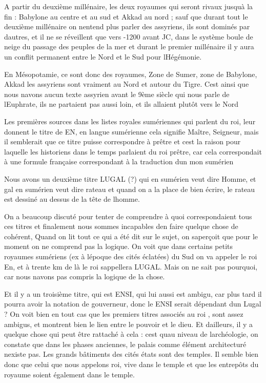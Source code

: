 \documentclass{article}
\begin{document}
A partir du deuxième millénaire, les deux royaumes qui seront rivaux
jusqu{\textquotesingle}à la fin  : Babylone au centre et au sud et
Akkad au nord ; sauf que durant tout le deuxième millénaire on
n{\textquotesingle}entend plus parler des assyriens, ils sont dominés
par d{\textquotesingle}autres, et il ne se réveillent que vers -1200
avant JC, dans le système boule de neige du passage des peuples de la
mer et durant le premier millénaire il y aura un conflit permanent
entre le Nord et le Sud pour l{\textquotesingle}Hégémonie.

En Mésopotamie, ce sont donc des royaumes, Zone de Sumer, zone de
Babylone, Akkad les  assyriens sont vraiment  au Nord et autour du
Tigre. C{\textquotesingle}est ainsi que nous n{\textquotesingle}avons
aucun texte assyrien avant le 9ème siècle qui nous parle de
l{\textquotesingle}Euphrate, ils ne partaient pas aussi loin, et ils
allaient plutôt vers le Nord

Les premières sources dans les listes royales sumériennes qui parlent du
roi, leur donnent le titre de EN, en langue sumérienne cela signifie
Maître, Seigneur, mais il semblerait que ce titre puisse correspondre à
prêtre et c{\textquotesingle}est la raison pour laquelle les historiens
dans le temps parlaient du roi prêtre, car cela correspondait à une
formule française correspondant à la traduction d{\textquotesingle}un
mon sumérien 

Nous avons un deuxième titre  LUGAL (?) qui en sumérien veut dire Homme,
et gal en sumérien veut dire rateau et quand on a la place de bien
écrire, le rateau est dessiné au dessus de la tête de
l{\textquotesingle}homme.

On a beaucoup discuté pour tenter de comprendre à quoi correspondaient
tous ces titres et finalement nous sommes incapables
d{\textquotesingle}en faire quelque chose de cohérent, Quand on lit
tout ce qui a été dit sur le sujet, on s{\textquotesingle}aperçoit que
pour le moment on ne comprend pas la logique. On voit que dans certains
petits royaumes sumériens (ex à l{\textquotesingle}époque des cités
éclatées) du Sud on va appeler le roi En, et à trente km de là  le roi
s{\textquotesingle}appellera LUGAL. Mais on ne sait pas pourquoi, car
nous n{\textquotesingle}avons pas compris la logique de la chose.

Et il y a un troisième titre, qui est ENSI, qui lui aussi est ambigu,
car plus tard il pourra avoir la notation de gouverneur, donc le ENSI
serait dépendant d{\textquotesingle}un Lugal ?  On voit bien en tout
cas que les premiers titres associés au roi , sont assez ambigus, et
montrent bien le lien entre le pouvoir et le dieu. Et
d{\textquotesingle}ailleurs, il y a quelque chose qui peut être
rattaché à cela  : c{\textquotesingle}est qu{\textquotesingle}au niveau
de l{\textquotesingle}archéologie, on constate que dans les phases
anciennes, le palais comme élément architecturé
n{\textquotesingle}existe pas. Les grands bâtiments des cités états
sont des temples. Il semble bien donc que celui que nous appelons roi,
vive dans le temple et que les entrepôts du royaume soient également
dans le temple.
\end{document}
